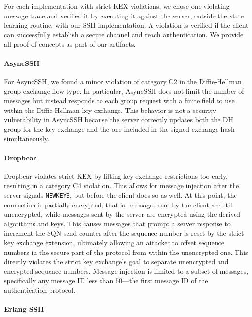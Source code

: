 For each implementation with strict KEX violations, we chose one violating message trace and verified it by executing it against the server, outside the state learning routine, with our SSH implementation. A violation is verified if the client can successfully establish a secure channel and reach authentication. We provide all proof-of-concepts as part of our artifacts.

\paragraph{AsyncSSH} 

For AsyncSSH, we found a minor violation of category C2 in the Diffie-Hellman group exchange flow type. In particular, AsyncSSH does not limit the number of \msgkexdhgexrequest messages but instead responds to each group request with a finite field to use within the Diffie-Hellman key exchange. This behavior is not a security vulnerability in AsyncSSH because the server correctly updates both the DH group for the key exchange and the one included in the signed exchange hash simultaneously.
    
\paragraph{Dropbear} 

Dropbear violates strict KEX by lifting key exchange restrictions too early, resulting in a category C4 violation. This allows for message injection after the server signals \texttt{NEWKEYS}, but before the client does so as well. At this point, the connection is partially encrypted; that is, messages sent by the client are still unencrypted, while messages sent by the server are encrypted using the derived algorithms and keys. This causes messages that prompt a server response to increment the SQN send counter after the sequence number is reset by the strict key exchange extension, ultimately allowing an attacker to offset sequence numbers in the secure part of the protocol from within the unencrypted one. This directly violates the strict key exchange's goal to separate unencrypted and encrypted sequence numbers. Message injection is limited to a subset of messages, specifically any message ID less than 50---the first message ID of the authentication protocol.

\paragraph{Erlang SSH} 

